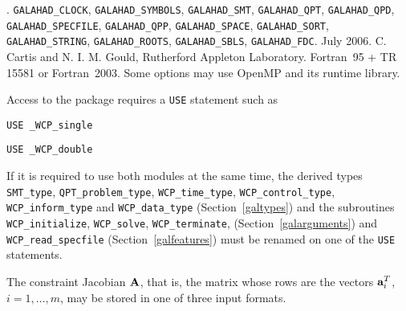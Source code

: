 \documentclass{galahad}
\newcommand{\packagename}{WCP}
\newcommand{\fullpackagename}{\libraryname\_\-\packagename}
\begin{document}

\galattributes
\galversions{\tt  \fullpackagename\_single, \fullpackagename\_double}.
\galuses 
{\tt GALAHAD\_\-CLOCK},
{\tt GALAHAD\_SY\-M\-BOLS}, 
{\tt GALAHAD\_SMT},
{\tt GALAHAD\_QPT}, {\tt GALAHAD\_QPD}, {\tt GALAHAD\_SPECFILE}, 
{\tt GALAHAD\_QPP}, {\tt GALAHAD\_SPACE}, {\tt GALAHAD\_\-SORT}, 
{\tt GALAHAD\_STRING}, {\tt GALAHAD\_\-ROOTS}, {\tt GALAHAD\_\-SBLS},
{\tt GALAHAD\_FDC}.
\galdate July 2006.
\galorigin C. Cartis and N. I. M. Gould, Rutherford Appleton Laboratory.
\gallanguage Fortran~95 + TR 15581 or Fortran~2003. 
\galparallelism Some options may use OpenMP and its runtime library.


\galhowto


Access to the package requires a {\tt USE} statement such as

\medskip{}

\hspace{8mm} {\tt USE \fullpackagename\_single}

\medskip{}

\hspace{8mm} {\tt USE  \fullpackagename\_double}

\medskip

\noindent
If it is required to use both modules at the same time, the derived types 
{\tt SMT\_type}, 
{\tt QPT\_problem\_type}, 
{\tt \packagename\_time\_type}, 
{\tt \packagename\_control\_type}, 
{\tt \packagename\_inform\_type} 
and
{\tt \packagename\_data\_type}
(Section~\ref{galtypes})
and the subroutines
{\tt \packagename\_initialize}, 
{\tt \packagename\_\-solve},
{\tt \packagename\_terminate},
(Section~\ref{galarguments})
and 
{\tt \packagename\_read\_specfile}
(Section~\ref{galfeatures})
must be renamed on one of the {\tt USE} statements.


\galmatrix
The constraint Jacobian ${\mathbf{A}}$, that is, the matrix 
whose rows are the vectors ${\mathbf{a}}_{i}^{T}$, $i = 1, \ldots , m$, 
may be stored in one of three input formats.
\end{document}
